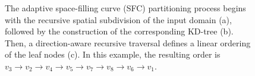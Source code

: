 \begin{figure}
\caption{The adaptive space-filling curve (SFC) partitioning process begins with the recursive spatial subdivision of the input domain (a), followed by the construction of the corresponding KD-tree (b). Then, a direction-aware recursive traversal defines a linear ordering of the leaf nodes (c). In this example, the resulting order is $v_3 \rightarrow v_2 \rightarrow v_4 \rightarrow v_5 \rightarrow v_7 \rightarrow v_8 \rightarrow v_6 \rightarrow v_1$.}
\label{fig:sfc}
\end{figure}